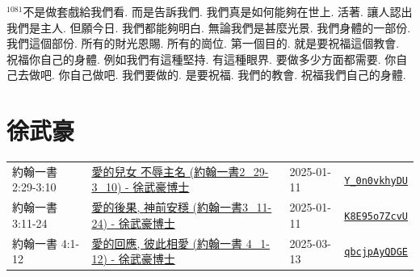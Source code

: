 \documentclass{book}
\begin{document}
$^{1081}$不是做套戲給我們看.
而是告訴我們.
我們真是如何能夠在世上.
活著.
讓人認出我們是主人.
但願今日.
我們都能夠明白.
無論我們是甚麼光景.
我們身體的一部份.
我們這個部份.
所有的財光恩賜.
所有的崗位.
第一個目的.
就是要祝福這個教會.
祝福你自己的身體.
例如我們有這種堅持.
有這種眼界.
要做多少方面都需要.
你自己去做吧.
你自己做吧.
我們要做的.
是要祝福.
我們的教會.
祝福我們自己的身體.
\newpage



\chapter{徐武豪}\label{ch:preacher4}
\begin{multicols}{3}
\minitoc
\end{multicols}
{ \scriptsize


\begin{xltabular}{\textwidth}{|p{0.15\textwidth} p{0.6\textwidth}|p{0.07\textwidth} p{0.1\textwidth}|}
\hline
約翰一書 2:29-3:10 & \hyperref[sec:Y_0n0vkhyDU]{愛的兒女 不辱主名 (約翰一書2\_29-3\_10) - 徐武豪博士} & 2025-01-11 & \href{https://youtube.com/watch?v=Y_0n0vkhyDU}{\texttt{Y\_0n0vkhyDU}} \\
約翰一書 3:11-24 & \hyperref[sec:K8E95o7ZcvU]{愛的後果, 神前安穩 (約翰一書3\_11-24) - 徐武豪博士} & 2025-01-11 & \href{https://youtube.com/watch?v=K8E95o7ZcvU}{\texttt{K8E95o7ZcvU}} \\
約翰一書 4:1-12 & \hyperref[sec:qbcjpAyQDGE]{愛的回應, 彼此相愛 (約翰一書 4\_1-12) - 徐武豪博士} & 2025-03-13 & \href{https://youtube.com/watch?v=qbcjpAyQDGE}{\texttt{qbcjpAyQDGE}} \\
\hline
\end{xltabular}
}
\newpage
\end{document}
